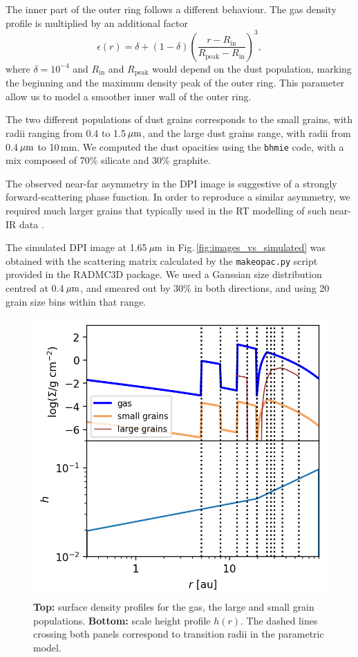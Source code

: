 \documentclass[letters,usenatbib,times]{mnras}
\begin{document}
The inner part of the outer ring follows a different behaviour. The gas density profile is multiplied by an additional factor
\begin{equation}
    \epsilon(r) = \delta +  (1 - \delta) \left(\frac{ r - R_\mathrm{in}}{R_\mathrm{peak} - R_\mathrm{in}}\right)^3,
\end{equation}
where $\delta=10^{-4}$ and $R_\mathrm{in}$ and $R_\mathrm{peak}$ would depend on the dust population, marking the beginning and the maximum density peak of the outer ring. This parameter allow us to model a smoother inner wall of the outer ring.

The two different populations of dust grains corresponds to  the small grains, with  radii ranging  from 0.4 to 1.5\,$\hbox{$\mu$m}$, and the large dust grains range, with radii  from 0.4\,$\hbox{$\mu$m}$ to 10\,mm. We computed the dust opacities using the {\tt bhmie} code, with  a mix composed of  70\% silicate and 30\% graphite. 

The observed near-far asymmetry in the DPI image is suggestive of a strongly forward-scattering phase function. In order to reproduce a similar  asymmetry, we required much larger grains that typically used in the RT modelling of  such near-IR data \citep[e.g.][]{2018MNRAS.477.5104C}. 

The simulated DPI image at 1.65\,$\hbox{$\mu$m}$ in Fig.\,\ref{fig:images_vs_simulated} was obtained with the scattering matrix calculated by the {\tt makeopac.py} script provided in the RADMC3D package. We used a  Gaussian size distribution centred at 0.4\,$\hbox{$\mu$m}$, and smeared  out by 30\% in both directions, and using 20 grain size bins within  that range. 

\begin{figure}
	\includegraphics[width=\columnwidth]{allprofiles.png}
        \caption{{\bf Top:}  surface density profiles for the gas, the large and small grain populations. {\bf Bottom:}  scale height profile $h(r)$. The dashed lines crossing both panels correspond to transition  radii in the parametric model.}
    \label{fig:profiles}
\end{figure}
\end{document}
